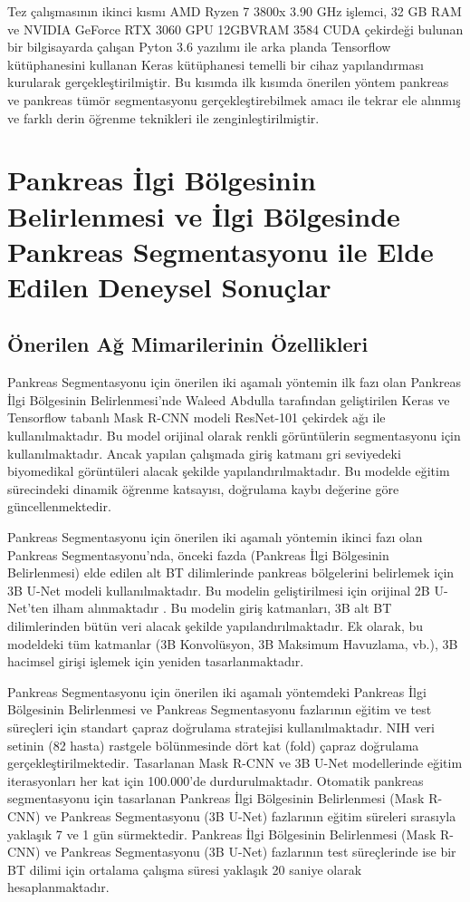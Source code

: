 Tez çalışmasının ikinci kısmı AMD Ryzen 7 3800x 3.90 GHz işlemci, 32 GB RAM ve NVIDIA GeForce RTX 3060 GPU 12GBVRAM 3584 CUDA çekirdeği bulunan bir bilgisayarda çalışan Pyton 3.6 yazılımı ile arka planda Tensorflow kütüphanesini kullanan Keras kütüphanesi temelli bir cihaz yapılandırması kurularak gerçekleştirilmiştir. Bu kısımda ilk kısımda önerilen yöntem pankreas ve pankreas tümör segmentasyonu gerçekleştirebilmek amacı ile tekrar ele alınmış ve farklı derin öğrenme teknikleri ile zenginleştirilmiştir.

\section{Pankreas İlgi Bölgesinin Belirlenmesi ve İlgi Bölgesinde Pankreas Segmentasyonu ile Elde Edilen Deneysel Sonuçlar}

\subsection{Önerilen Ağ Mimarilerinin Özellikleri}
Pankreas Segmentasyonu için önerilen iki aşamalı yöntemin ilk fazı olan Pankreas İlgi Bölgesinin Belirlenmesi'nde Waleed Abdulla tarafından geliştirilen Keras ve Tensorflow tabanlı Mask R-CNN modeli \cite{he2017mask} ResNet-101 çekirdek ağı ile kullanılmaktadır. Bu model orijinal olarak renkli görüntülerin segmentasyonu için kullanılmaktadır. Ancak yapılan çalışmada giriş katmanı gri seviyedeki biyomedikal görüntüleri alacak şekilde yapılandırılmaktadır. Bu modelde eğitim sürecindeki dinamik öğrenme katsayısı, doğrulama kaybı değerine göre güncellenmektedir.

Pankreas Segmentasyonu için önerilen iki aşamalı yöntemin ikinci fazı olan Pankreas Segmentasyonu’nda, önceki fazda (Pankreas İlgi Bölgesinin Belirlenmesi) elde edilen alt BT dilimlerinde pankreas bölgelerini belirlemek için 3B U-Net modeli kullanılmaktadır. Bu modelin geliştirilmesi için orijinal 2B U-Net'ten ilham alınmaktadır \cite{ronneberger2015u}. Bu modelin giriş katmanları, 3B alt BT dilimlerinden bütün veri alacak şekilde yapılandırılmaktadır. Ek olarak, bu modeldeki tüm katmanlar (3B Konvolüsyon, 3B Maksimum Havuzlama, vb.), 3B hacimsel girişi işlemek için yeniden tasarlanmaktadır.

Pankreas Segmentasyonu için önerilen iki aşamalı yöntemdeki Pankreas İlgi Bölgesinin Belirlenmesi ve Pankreas Segmentasyonu fazlarının eğitim ve test süreçleri için standart çapraz doğrulama stratejisi kullanılmaktadır. NIH veri setinin (82 hasta) rastgele bölünmesinde dört kat (fold) çapraz doğrulama gerçekleştirilmektedir. Tasarlanan Mask R-CNN ve 3B U-Net modellerinde eğitim iterasyonları her kat için 100.000'de durdurulmaktadır. Otomatik pankreas segmentasyonu için tasarlanan Pankreas İlgi Bölgesinin Belirlenmesi (Mask R-CNN) ve Pankreas Segmentasyonu (3B U-Net) fazlarının eğitim süreleri sırasıyla yaklaşık 7 ve 1 gün sürmektedir. Pankreas İlgi Bölgesinin Belirlenmesi (Mask R-CNN) ve Pankreas Segmentasyonu (3B U-Net) fazlarının test süreçlerinde ise bir BT dilimi için ortalama çalışma süresi yaklaşık 20 saniye olarak hesaplanmaktadır.

